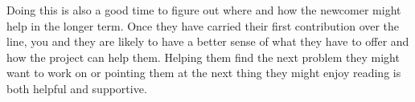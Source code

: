 \documentclass[10pt,letterpaper]{article}
\begin{document}
Doing this is also a good time to figure out where and how the newcomer might help in the longer term.
Once they have carried their first contribution over the line,
you and they are likely to have a better sense of what they have to offer
and how the project can help them.
Helping them find the next problem they might want to work on
or pointing them at the next thing they might enjoy reading
is both helpful and supportive.


\end{document}

